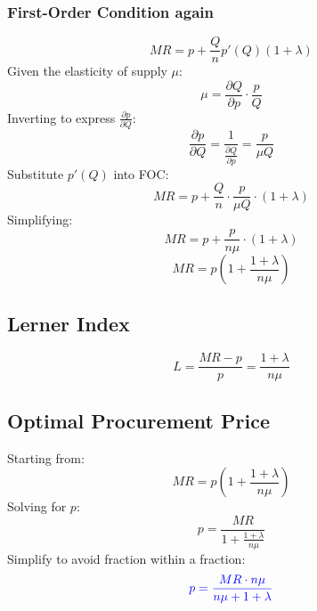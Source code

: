 \documentclass[12pt]{article}
\begin{document}
\subsubsection{First-Order Condition again}
\begin{equation}
MR = p + \frac{Q}{n} p'(Q) (1 + \lambda)
\end{equation}
Given the elasticity of supply \(\mu\):
\begin{equation}
\mu = \frac{\partial Q}{\partial p} \cdot \frac{p}{Q}
\end{equation}
Inverting to express \(\frac{\partial p}{\partial Q}\):
\begin{equation}
\frac{\partial p}{\partial Q} = \frac{1}{\frac{\partial Q}{\partial p}} = \frac{p}{\mu Q}
\end{equation}
Substitute \( p'(Q) \) into FOC:
\begin{equation}
MR = p + \frac{Q}{n} \cdot \frac{p}{\mu Q} \cdot (1 + \lambda)
\end{equation}
Simplifying:
\begin{equation}
MR = p + \frac{p}{n \mu} \cdot (1 + \lambda)
\end{equation}
\begin{equation}
MR = p \left(1 + \frac{1 + \lambda}{n \mu}\right)
\end{equation}

\subsection{Lerner Index}
\begin{equation}
L = \frac{MR - p}{p} = \frac{1 + \lambda}{n \mu}
\end{equation}

\subsection{Optimal Procurement Price}
Starting from:
\begin{equation}
MR = p \left(1 + \frac{1 + \lambda}{n \mu}\right)
\end{equation}
Solving for \( p \):
\begin{equation}
p = \frac{MR}{1 + \frac{1 + \lambda}{n \mu}}
\end{equation}
Simplify to avoid fraction within a fraction:
\begin{equation}
\textcolor{blue}{p = \frac{MR \cdot n \mu}{n \mu + 1 + \lambda}}
\label{Eq: optimal procure price, general case}
\end{equation}
\end{document}
